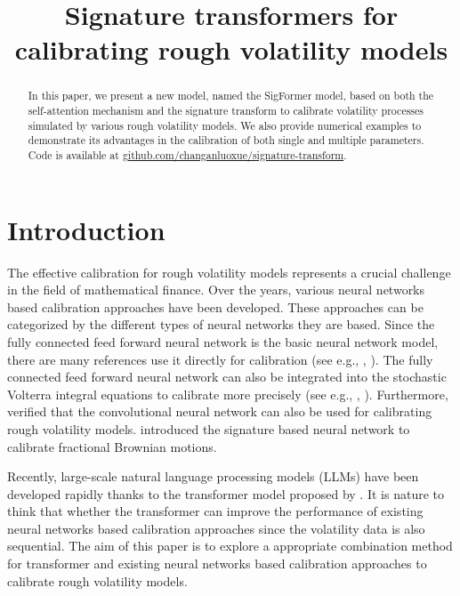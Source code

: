 \documentclass[]{article}
\title{Signature transformers for calibrating rough volatility models}
\author{}
\date{}
\renewcommand{\(}{\left(}
\renewcommand{\)}{\right)}
\begin{document}
	\maketitle
	\begin{abstract}
	In this paper, we present a new model, named the SigFormer model, based on both the self-attention mechanism and the signature transform to calibrate volatility processes simulated by various rough volatility models. We also provide numerical examples to demonstrate its advantages in the calibration of both single and multiple parameters. Code is available at \href{github.com/changanluoxue/signature-transform}{github.com/changanluoxue/signature-transform}.
	\end{abstract}
	
	\section{Introduction}\label{sec-introduction}
	The effective calibration for rough volatility models represents a crucial challenge in the field of mathematical finance. Over the years, various neural networks based calibration approaches have been developed. These approaches can be categorized by the different types of neural networks they are based. Since the fully connected feed forward neural network is the basic neural network model, there are many references use it directly for calibration (see e.g., \cite{horvath2021deep}, \cite{rosenbaum2021deep}). The fully connected feed forward neural network can also be integrated into the stochastic Volterra integral equations to calibrate more precisely (see e.g., \cite{wang2021NSDE}, \cite{ma2023rough}). Furthermore, \cite{stone_2020} verified that the convolutional neural network can also be used for calibrating rough volatility models. \cite{Lyons_2019_DeepSignature} introduced the signature based neural network to calibrate fractional Brownian motions. 
	
	Recently, large-scale natural language processing models (LLMs) have been developed rapidly thanks to the transformer model proposed by \cite{vaswani_2017}. It is nature to think that whether the transformer can improve the performance of existing neural networks based calibration approaches since the volatility data is also sequential. The aim of this paper is to explore a appropriate combination method for transformer and existing neural networks based calibration approaches to calibrate rough volatility models.
	
\end{document}
